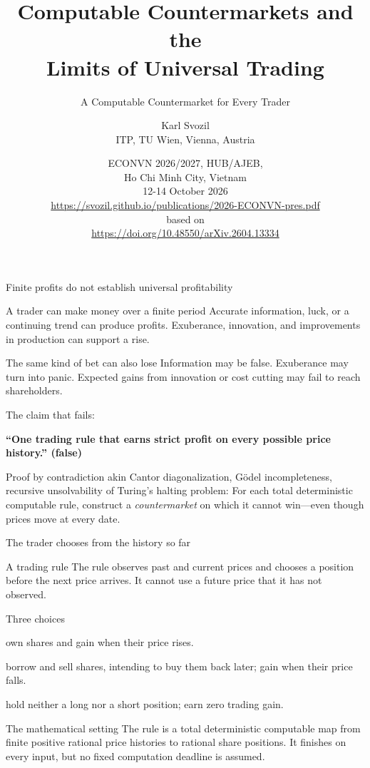\documentclass{beamer}
\title{Computable Countermarkets and the\\Limits of Universal Trading}
\subtitle{A Computable Countermarket for Every Trader}
\author{\texorpdfstring{Karl Svozil\\ITP, TU Wien, Vienna, Austria}%
{Karl Svozil, ITP, TU Wien, Vienna, Austria}}
\date{ECONVN 2026/2027, HUB/AJEB,\\ Ho Chi Minh City, Vietnam\\
12-14 October 2026\\
{\footnotesize \url{https://svozil.github.io/publications/2026-ECONVN-pres.pdf} }
\\
based on
\\
\url{https://doi.org/10.48550/arXiv.2604.13334}
}
\begin{document}
\begin{frame}
\titlepage
\end{frame}

\begin{frame}{Finite profits do not establish universal profitability}
\small
\begin{block}{A trader can make money over a finite period}
Accurate information, luck, or a continuing trend can produce profits.
Exuberance, innovation, and improvements in production can support a rise.
\end{block}
\begin{exampleblock}{The same kind of bet can also lose}
Information may be false. Exuberance may turn into panic.
Expected gains from innovation or cost cutting may fail to reach shareholders.
\end{exampleblock}
\begin{alertblock}{The claim that fails:}
\par\medskip
{\color{red}\bf ``One trading rule that earns strict profit on every possible
price history.'' (false)}
\par\medskip
Proof by contradiction akin Cantor diagonalization, G\"odel incompleteness, recursive unsolvability of Turing's halting problem: For each total deterministic computable rule, construct a
\emph{countermarket} on which it cannot win---even though prices move at
every date.
\end{alertblock}
\end{frame}


\begin{frame}{The trader chooses from the history so far}
\small
\begin{block}{A trading rule}
The rule observes past and current prices and chooses a position before
the next price arrives. It cannot use a future price that it has not observed.
\end{block}
\begin{exampleblock}{Three choices}
\begin{description}
\setlength{\itemsep}{0.55em}
\item[Long:] own shares and gain when their price rises.
\item[Short:] borrow and sell shares, intending to buy them back later;
gain when their price falls.
\item[Wait:] hold neither a long nor a short position; earn zero trading gain.
\end{description}
\end{exampleblock}
\begin{alertblock}{The mathematical setting}
The rule is a total deterministic computable map from finite positive
rational price histories to rational share positions.
It finishes on every input, but no fixed computation deadline is assumed.
\end{alertblock}
\end{frame}
\end{document}

